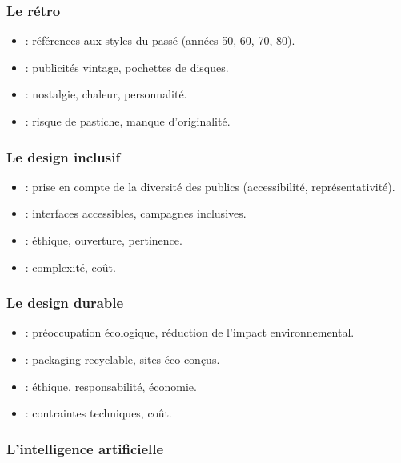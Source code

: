 \subsubsection{Le rétro}

\begin{itemize}
    \item {} : références aux styles du passé (années 50, 60, 70, 80).
    \item {} : publicités vintage, pochettes de disques.
    \item {} : nostalgie, chaleur, personnalité.
    \item {} : risque de pastiche, manque d'originalité.
\end{itemize}

\subsubsection{Le design inclusif}

\begin{itemize}
    \item {} : prise en compte de la diversité des publics (accessibilité, représentativité).
    \item {} : interfaces accessibles, campagnes inclusives.
    \item {} : éthique, ouverture, pertinence.
    \item {} : complexité, coût.
\end{itemize}

\subsubsection{Le design durable}

\begin{itemize}
    \item {} : préoccupation écologique, réduction de l'impact environnemental.
    \item {} : packaging recyclable, sites éco-conçus.
    \item {} : éthique, responsabilité, économie.
    \item {} : contraintes techniques, coût.
\end{itemize}

\subsubsection{L'intelligence artificielle}

